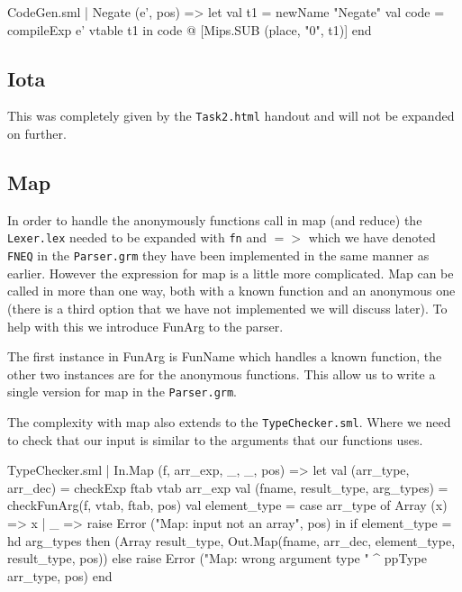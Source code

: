 \documentclass[11pt,a4paper,oneside]{report}
\begin{document}
\begin{code}[firstnumber=265]{CodeGen.sml}
  | Negate (e', pos) =>
    let
      val t1 = newName "Negate"
      val code = compileExp e' vtable t1
    in
      code @ [Mips.SUB (place, "0", t1)]
    end
\end{code}

\subsection*{Iota}
This was completely given by the \texttt{Task2.html} handout and will not be expanded on further.

\subsection*{Map}
In order to handle the anonymously functions call in map (and reduce) the \texttt{Lexer.lex} needed to be expanded with \texttt{fn} and $=>$ which we have denoted \texttt{FNEQ} in the \texttt{Parser.grm} they have been implemented in the same manner as earlier.
However the expression for map is a little more complicated. Map can be called in more than one way, both with a known function and an anonymous one (there is a third option that we have not implemented we will discuss later). To help with this we introduce FunArg to the parser.
The first instance in FunArg is FunName which handles a known function, the other two instances are for the anonymous functions. This allow us to write a single version for map in the \texttt{Parser.grm}.

The complexity with map also extends to the \texttt{TypeChecker.sml}. Where we need to check that our input is similar to the arguments that our functions uses.
\begin{code}[firstnumber=239]{TypeChecker.sml}
| In.Map (f, arr_exp, _, _, pos)
      =>
      let
          val (arr_type, arr_dec) = checkExp ftab vtab arr_exp
          val (fname, result_type, arg_types) = checkFunArg(f, vtab, ftab, pos)
          val element_type = case arr_type of
                                    Array (x) => x
                                  | _ => raise Error ("Map: input not an array", pos)
      in
          if element_type = hd arg_types
          then (Array result_type, Out.Map(fname, arr_dec, element_type, result_type, pos))
          else raise Error ("Map: wrong argument type " ^
                              ppType arr_type, pos)
      end
\end{code}
\end{document}
